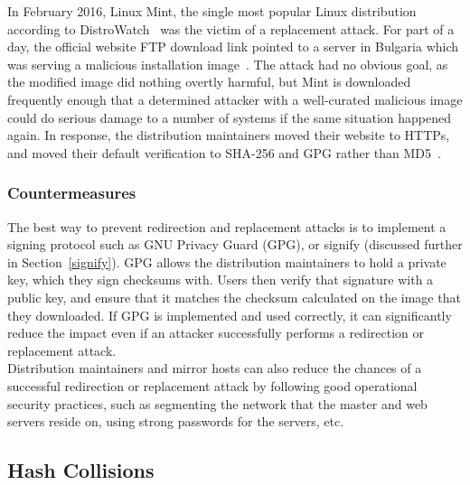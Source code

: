 \documentclass[conference]{IEEEtran}
\begin{document}
In February 2016, Linux Mint, the single most popular Linux distribution according to
DistroWatch~\cite{DistroWatch} was the victim of a replacement attack. For part of a day,
the official website FTP download link pointed to a server in Bulgaria which was serving a
malicious installation image~\cite{mintblog}. The attack had no obvious goal, as the modified image
did nothing overtly harmful, but Mint is
downloaded frequently enough that a determined attacker with a well-curated malicious image could
do serious damage to a number of systems if the same situation happened again. In response,
the distribution maintainers moved
their website to HTTPs, and moved their default verification to SHA-256 and GPG rather than
MD5~\cite{mintnews}.

\subsubsection{Countermeasures}

The best way to prevent redirection and replacement attacks is to implement a signing protocol
such as GNU Privacy Guard (GPG), or signify (discussed further in Section~\ref{signify}).
GPG allows the distribution maintainers to hold a private key, which they sign checksums with.
Users then verify that signature with a public key, and ensure that it matches the checksum
calculated on the image that they downloaded. If GPG is implemented and used correctly, it can
significantly reduce the impact even if an attacker successfully performs a redirection or
replacement attack.\\
\indent Distribution maintainers and mirror hosts can also reduce the chances of a successful
redirection or replacement attack by following good operational security practices, such as
segmenting the network that the master and web servers reside on, using strong passwords for
the servers, etc.

\subsection{Hash Collisions}
\end{document}
